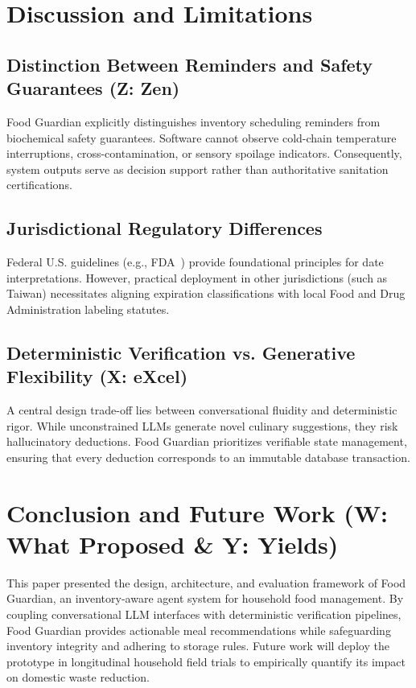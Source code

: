 \section{Discussion and Limitations}

\subsection{Distinction Between Reminders and Safety Guarantees (Z: Zen)}
Food Guardian explicitly distinguishes inventory scheduling reminders from biochemical safety guarantees. Software cannot observe cold-chain temperature interruptions, cross-contamination, or sensory spoilage indicators. Consequently, system outputs serve as decision support rather than authoritative sanitation certifications.

\subsection{Jurisdictional Regulatory Differences}
Federal U.S. guidelines (e.g., FDA~\cite{R2_FDA2026}) provide foundational principles for date interpretations. However, practical deployment in other jurisdictions (such as Taiwan) necessitates aligning expiration classifications with local Food and Drug Administration labeling statutes.

\subsection{Deterministic Verification vs. Generative Flexibility (X: eXcel)}
A central design trade-off lies between conversational fluidity and deterministic rigor. While unconstrained LLMs generate novel culinary suggestions, they risk hallucinatory deductions. Food Guardian prioritizes verifiable state management, ensuring that every deduction corresponds to an immutable database transaction.

\section{Conclusion and Future Work (W: What Proposed \& Y: Yields)}
This paper presented the design, architecture, and evaluation framework of Food Guardian, an inventory-aware agent system for household food management. By coupling conversational LLM interfaces with deterministic verification pipelines, Food Guardian provides actionable meal recommendations while safeguarding inventory integrity and adhering to storage rules. Future work will deploy the prototype in longitudinal household field trials to empirically quantify its impact on domestic waste reduction.
